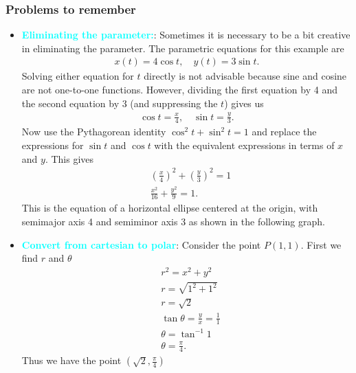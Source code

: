 \documentclass{report}
\begin{document}
    \subsubsection{Problems to remember}
    \begin{itemize}
        \item \textbf{\textcolor{cyan}{Eliminating the parameter:}}:
            Sometimes it is necessary to be a bit creative in eliminating the parameter. The parametric equations for this example are
            \begin{align*}
                x(t) = 4\cos{t}, \quad y(t) = 3\sin{t}
            .\end{align*}
            \bigbreak \noindent 
            Solving either equation for $t$ directly is not advisable because sine and cosine are not one-to-one functions. However, dividing the first equation by 4 and the second equation by 3 (and suppressing the $t$) gives us
            \begin{align*}
                \cos{t} = \frac{x}{4}, \quad \sin{t} = \frac{y}{3}
            .\end{align*}
            \bigbreak \noindent 
            Now use the Pythagorean identity  $\cos^{2}{t} + \sin^{2}{t} = 1$ and replace the expressions for $\sin{t}$ and $\cos{t}$ with the equivalent expressions in terms of $x$ and $y$. This gives
            \begin{align*}
        &\left(\frac{x}{4}\right)^{2} +  \left(\frac{y}{3}\right)^{2} = 1 \\
        &\frac{x^{2}}{16}  + \frac{y^{2}}{9} = 1
    .\end{align*}
    \bigbreak \noindent 
    This is the equation of a horizontal ellipse centered at the origin, with semimajor axis 4 and semiminor axis 3 as shown in the following graph. 
    \item \textbf{\textcolor{cyan}{Convert from cartesian to polar}}: Consider the point $P(1,1)$. First we find $r$ and $\theta$
        \begin{align*}
            &r^{2} = x^{2} + y^{2} \\
            &r = \sqrt{1^{2} + 1^{2}} \\
            &r=\sqrt{2} \\
            &\tan{\theta } = \frac{y}{x} = \frac{1}{1} \\
            &\theta  = \tan^{-1}{1} \\
            &\theta  = \frac{\pi}{4}
        .\end{align*}
        Thus we have the point $\left(\sqrt{2}, \frac{\pi}{4}\right) $

\end{itemize}
\end{document}
